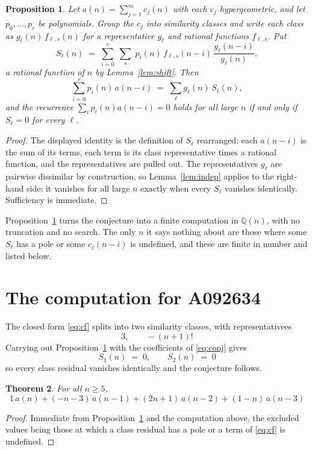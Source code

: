\documentclass[11pt,a4paper]{article}
\theoremstyle{plain}
\newtheorem{theorem}{Theorem}
\newtheorem{proposition}[theorem]{Proposition}
\theoremstyle{definition}
\begin{document}
\begin{proposition}\label{prop:main}
Let $a(n)=\sum_{j=1}^{m}c_{j}(n)$ with each $c_{j}$ hypergeometric, and let
$p_{0},\dots,p_{r}$ be polynomials. Group the $c_{j}$ into similarity classes and write
each class as $g_{\ell}(n)\,f_{\ell,s}(n)$ for a representative $g_{\ell}$ and rational
functions $f_{\ell,s}$. Put
\[
S_{\ell}(n)\;=\;\sum_{i=0}^{r}\;\sum_{s}\;p_{i}(n)\,f_{\ell,s}(n-i)\,
\frac{g_{\ell}(n-i)}{g_{\ell}(n)} ,
\]
a rational function of $n$ by Lemma~\ref{lem:shift}. Then
\[
\sum_{i=0}^{r}p_{i}(n)\,a(n-i)\;=\;\sum_{\ell}g_{\ell}(n)\,S_{\ell}(n),
\]
and the recurrence $\sum_{i}p_{i}(n)a(n-i)=0$ holds for all large $n$ if and only if
$S_{\ell}=0$ for every $\ell$.
\end{proposition}

\begin{proof}
The displayed identity is the definition of $S_{\ell}$ rearranged: each $a(n-i)$ is the
sum of its terms, each term is its class representative times a rational function, and the
representatives are pulled out. The representatives $g_{\ell}$ are pairwise dissimilar by
construction, so Lemma~\ref{lem:indep} applies to the right-hand side: it vanishes for all
large $n$ exactly when every $S_{\ell}$ vanishes identically. Sufficiency is immediate.
\end{proof}

Proposition~\ref{prop:main} turns the conjecture into a finite computation in
$\mathbb{Q}(n)$, with no truncation and no search. The only $n$ it says nothing about are
those where some $S_{\ell}$ has a pole or some $c_{j}(n-i)$ is undefined, and these are
finite in number and listed below.

\section{The computation for A092634}

The closed form \eqref{eq:cf} splits into two similarity classes, with
representativees
\[
3,\qquad - \left(n + 1\right)!
\]
Carrying out Proposition~\ref{prop:main} with the coefficients of \eqref{eq:conj} gives
\[
S_{1}(n)\;=\;0,\qquad S_{2}(n)\;=\;0
\]
so every class residual vanishes identically and the conjecture follows.

\begin{theorem}
For all $n\ge 5$,
\[
1\,a(n) + (- n - 3)\,a(n-1) + (2 n + 1)\,a(n-2) + (1 - n)\,a(n-3)
\]
\end{theorem}

\begin{proof}
Immediate from Proposition~\ref{prop:main} and the computation above, the excluded values
being those at which a class residual has a pole or a term of \eqref{eq:cf} is undefined.
\end{proof}
\end{document}
